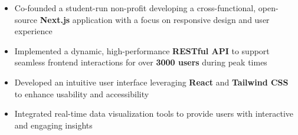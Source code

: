 \begin{itemize}
    \item Co-founded a student-run non-profit developing a cross-functional, open-source \textbf{Next.js} application with a focus on responsive design and user experience
    \item Implemented a dynamic, high-performance \textbf{RESTful API} to support seamless frontend interactions for over \textbf{3000 users} during peak times
    \item Developed an intuitive user interface leveraging \textbf{React} and \textbf{Tailwind CSS} to enhance usability and accessibility
    \item Integrated real-time data visualization tools to provide users with interactive and engaging insights
\end{itemize}
